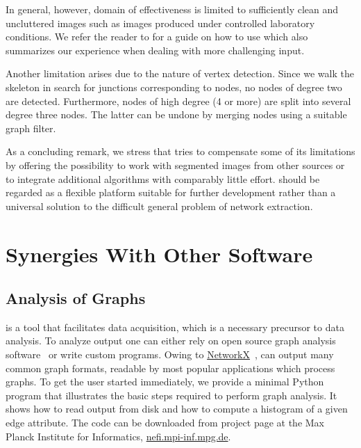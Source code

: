 		In general, however, \NEFIs domain of effectiveness is limited to sufficiently clean and uncluttered images such as images produced under controlled laboratory conditions. We refer the reader to  for a guide on how to use \NEFI which also summarizes our experience when dealing with more challenging input.

		Another limitation arises due to the nature of \NEFIs vertex detection. Since we walk the skeleton in search for junctions corresponding to nodes, no nodes of degree two are detected. Furthermore, nodes of high degree (4 or more) are split into several degree three nodes. The latter can be undone by merging nodes using a suitable graph filter.

		As a concluding remark, we stress that \NEFI tries to compensate some of its limitations by offering the possibility to work with segmented images from other sources or to integrate additional algorithms with comparably little effort. \NEFI should be regarded as a flexible platform suitable for further development rather than a universal solution to the difficult general problem of network extraction. 

\section{Synergies With Other Software}

	\subsection{Analysis of Graphs}

		\NEFI is a tool that facilitates data acquisition, which is a necessary precursor to data analysis. To analyze \NEFIs output one can either rely on open source graph analysis software~\cite{ICWSM09154,snap,batagelj1998pajek,5437689,loscalzo2008social,networkx} or write custom programs. Owing to \href{https://networkx.github.io/documentation/latest/index.html}{NetworkX}~\cite{networkx}, \NEFI can output many common graph formats, readable by most popular applications which process graphs. To get the user started immediately, we provide a minimal Python program that illustrates the basic steps required to perform graph analysis. It shows how to read \NEFIs output from disk and how to compute a histogram of a given edge attribute. The code can be downloaded from \NEFIs project page at the Max Planck Institute for Informatics, \href{http://nefi.mpi-inf.mpg.de}{nefi.mpi-inf.mpg.de}.


